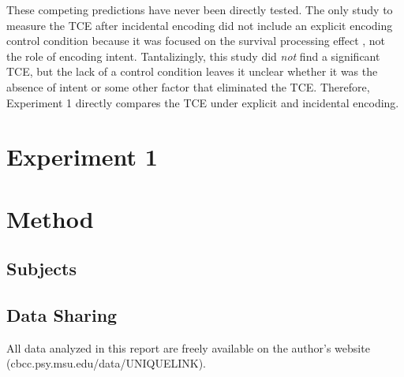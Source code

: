 \documentclass[jou,natbib]{apa6} %
\begin{document}

These competing predictions have never been directly tested. The only study to measure the TCE after incidental encoding \citep{NairEtal17} did not include an explicit encoding control condition because it was focused on the survival processing effect \citep{NairPand16}, not the role of encoding intent. Tantalizingly, this study did \emph{not} find a significant TCE, but the lack of a control condition leaves it unclear whether it was the absence of intent or some other factor that eliminated the TCE. Therefore, Experiment 1 directly compares the TCE under explicit and incidental encoding.

\section{Experiment 1}

\section{Method}

\newcommand\listlength{16} %
\newcommand\presrate{4 seconds} %
\newcommand\isi{1 second} %
\newcommand\DFRDelay{16 seconds} %
\newcommand\recalltime{75 seconds} %
\newcommand\totalss{XX}
\newcommand\totalexcluded{XX}

\subsection{Subjects}

\subsection{Data Sharing}All data analyzed in this report are freely available on the author's website (cbcc.psy.msu.edu/data/UNIQUELINK).
\end{document}

